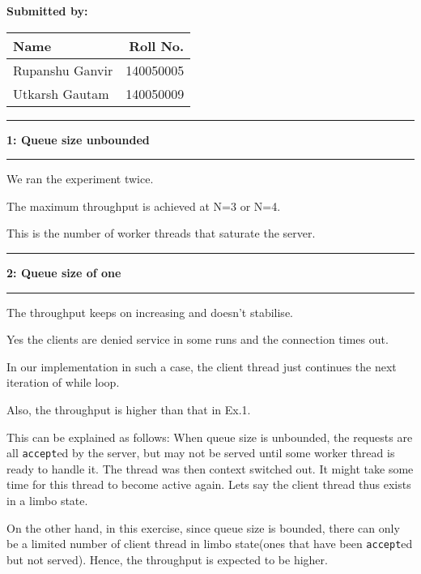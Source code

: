 \documentclass[11pt]{article}
\newcommand\question[2]{\vspace{.25in}\hrule\textbf{#1: #2}\vspace{.5em}\hrule\vspace{.10in}}
\begin{document}
\raggedright
\newcommand\NAME{[CS333] Operating Systems Lab}  %
\newcommand\ANDREWID{}     %
\newcommand\HWNUM{04}              %


\begin{center}
\center \textbf{Submitted by:}
\end{center}
\begin{table}[htb]
\centering
\begin{tabular}{ l r }
 \hline
 \textbf{Name} & \textbf{Roll No.} \\
 \hline
 Rupanshu Ganvir & 140050005 \\ 
 Utkarsh Gautam & 140050009 \\
 \hline
\end{tabular}
\end{table}


\question{1}{Queue size unbounded} 

We ran the experiment twice.

The maximum throughput is achieved at N=3 or N=4.

This is the number of worker threads that saturate the server.


\question{2}{Queue size of one}

The throughput keeps on increasing and doesn't stabilise. 

Yes the clients are denied service in some runs and the connection times out.

In our implementation in such a case, the client thread just continues 
the next iteration of while loop.

Also, the throughput is higher than that in Ex.1. 

This can be explained as follows: When queue size is unbounded, the requests 
are all \texttt{accept}ed by the server, but may not be served until some worker thread
is ready to handle it. The thread was then context switched out.
It might take some time for this thread to become active again.
Lets say the client thread thus exists in a limbo state.

On the other hand, in this exercise, since queue size is bounded, there can 
only be a limited number of client thread in limbo state(ones that have been 
\texttt{accept}ed but not served). Hence, the throughput is expected to be higher. 


\end{document}
